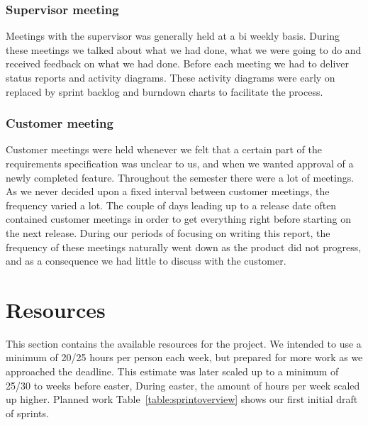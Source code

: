 \subsubsection{Supervisor meeting}
Meetings with the supervisor was generally held at a bi weekly basis.
During these meetings we talked about what we had done, what we were
going to do and received feedback on what we had done. Before each
meeting we had to deliver status reports and activity diagrams. These
activity diagrams were early on replaced by sprint backlog and burndown
charts to facilitate the process. 

\subsubsection{Customer meeting}
Customer meetings were held whenever we felt that a certain part of the
requirements specification was unclear to us, and when we wanted
approval of a newly completed feature. Throughout the semester there
were a lot of meetings. As we never decided upon a fixed interval
between customer meetings, the frequency varied a lot. The couple of
days leading up to a release date often contained customer meetings in
order to get everything right before starting on the next release.
During our periods of focusing on writing this report, the frequency of
these meetings naturally went down as the product did not progress, and
as a consequence we had little to discuss with the customer. 

\section{Resources}
This section contains the available resources for the project. We
intended to use a minimum of 20/25 hours per person each week, but
prepared for more work as we approached the deadline. This estimate was
later scaled up to a minimum of 25/30 to weeks before easter, During
easter, the amount of hours per week scaled up higher.
Planned work 
Table~\ref{table:sprintoverview} shows our first initial draft of sprints. 

